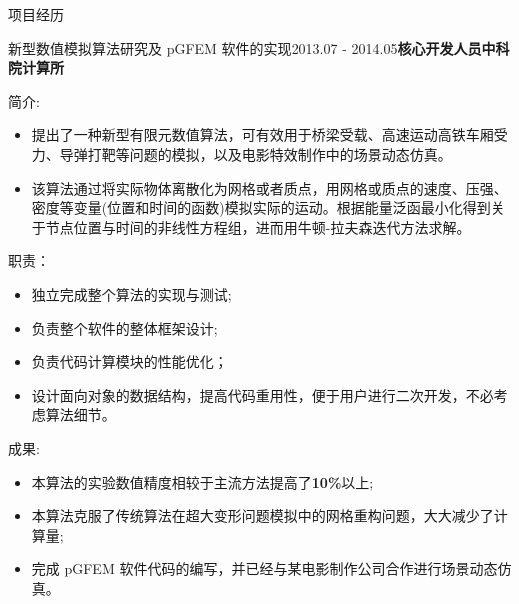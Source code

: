 \documentclass{resume} %
\begin{document}
\begin{rSection}{项目经历}

\begin{rSubsection}{新型数值模拟算法研究及 pGFEM 软件的实现}{2013.07 - 2014.05}{\bf 核心开发人员}{\bf 中科院计算所}

\item {简介:}
\setlength{\itemsep}{0pt} %
\setlength{\parsep}{0pt} %
\setlength{\parskip}{0pt} %
\begin{itemize}
\setlength{\itemsep}{0pt} %
\setlength{\parsep}{0pt} %
\setlength{\parskip}{0pt} %
  \item 提出了一种新型有限元数值算法，可有效用于桥梁受载、高速运动高铁车厢受力、导弹打靶等问题的模拟，以及电影特效制作中的场景动态仿真。
  \item 该算法通过将实际物体离散化为网格或者质点，用网格或质点的速度、压强、密度等变量(位置和时间的函数)模拟实际的运动。根据能量泛函最小化得到关于节点位置与时间的非线性方程组，进而用牛顿-拉夫森迭代方法求解。
\end{itemize}

\item 职责：
\setlength{\itemsep}{0pt} %
\setlength{\parsep}{0pt} %
\setlength{\parskip}{0pt} %
\begin{itemize}
\setlength{\itemsep}{0pt} %
\setlength{\parsep}{0pt} %
\setlength{\parskip}{0pt} %
    \item 独立完成整个算法的实现与测试;
    \item 负责整个软件的整体框架设计;
    \item 负责代码计算模块的性能优化；
    \item 设计面向对象的数据结构，提高代码重用性，便于用户进行二次开发，不必考虑算法细节。
\end{itemize}
\item 成果: 
\begin{itemize}
\setlength{\itemsep}{0pt} %
\setlength{\parsep}{0pt} %
\setlength{\parskip}{0pt} %
\item 本算法的实验数值精度相较于主流方法提高了{\bf 10\%}以上;
\item 本算法克服了传统算法在超大变形问题模拟中的网格重构问题，大大减少了计算量;
\item 完成 pGFEM 软件代码的编写，并已经与某电影制作公司合作进行场景动态仿真。
\end{itemize}


\end{rSubsection}
\end{rSection}
\end{document}
